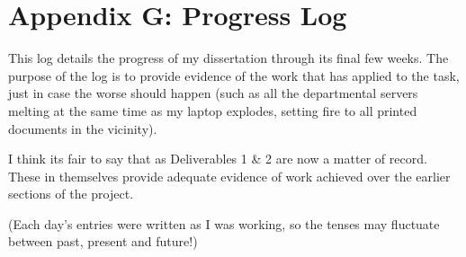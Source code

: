 \section{Appendix G: Progress Log}

This log details the progress of my dissertation through its final few weeks. The purpose of the log is to provide evidence of the work that has applied to the task, just in case the worse should happen (such as all the departmental servers melting at the same time as my laptop explodes, setting fire to all printed documents in the vicinity).

I think its fair to say that as Deliverables 1 \& 2 are now a matter of record. These in themselves provide adequate evidence of work achieved over the earlier sections of the project.

(Each day's entries were written as I was working, so the tenses may fluctuate between past, present and future!)